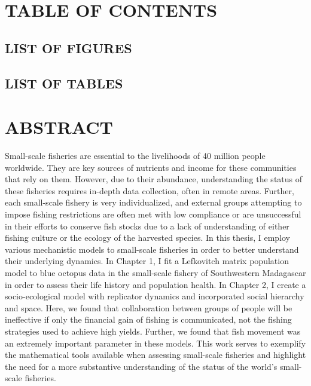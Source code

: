 \documentclass[
  12pt,
]{article}
\begin{document}
\newpage

\hypertarget{table-of-contents}{%
\section{TABLE OF CONTENTS}\label{table-of-contents}}

\vspace{-1cm}
\tableofcontents

\newpage

\hypertarget{list-of-figures}{%
\subsection{LIST OF FIGURES}\label{list-of-figures}}

\vspace{-1.5cm}
\listoffigures

\newpage

\hypertarget{list-of-tables}{%
\subsection{LIST OF TABLES}\label{list-of-tables}}

\vspace{-1.5cm}
\listoftables

\newpage

\hypertarget{abstract}{%
\section{ABSTRACT}\label{abstract}}

Small-scale fisheries are essential to the livelihoods of 40 million people worldwide. They are key sources of nutrients and income for these communities that rely on them. However, due to their abundance, understanding the status of these fisheries requires in-depth data collection, often in remote areas. Further, each small-scale fishery is very individualized, and external groups attempting to impose fishing restrictions are often met with low compliance or are unsuccessful in their efforts to conserve fish stocks due to a lack of understanding of either fishing culture or the ecology of the harvested species. In this thesis, I employ various mechanistic models to small-scale fisheries in order to better understand their underlying dynamics. In Chapter 1, I fit a Lefkovitch matrix population model to blue octopus data in the small-scale fishery of Southwestern Madagascar in order to assess their life history and population health. In Chapter 2, I create a socio-ecological model with replicator dynamics and incorporated social hierarchy and space. Here, we found that collaboration between groups of people will be ineffective if only the financial gain of fishing is communicated, not the fishing strategies used to achieve high yields. Further, we found that fish movement was an extremely important parameter in these models. This work serves to exemplify the mathematical tools available when assessing small-scale fisheries and highlight the need for a more substantive understanding of the status of the world's small-scale fisheries.
\end{document}
